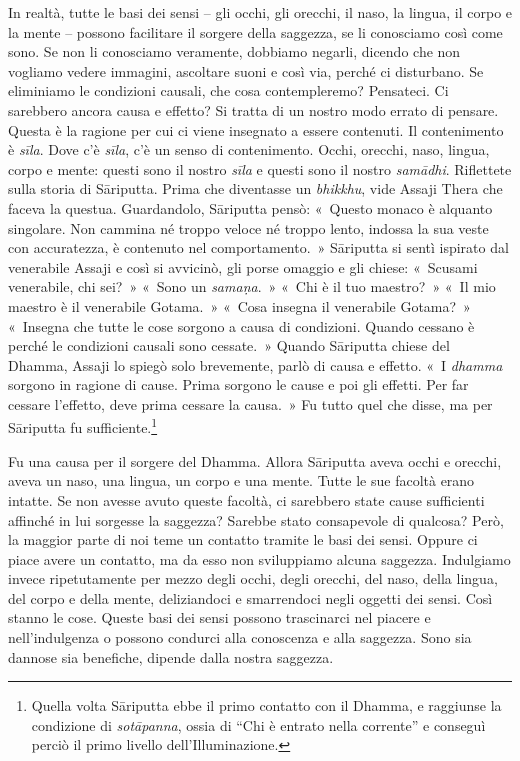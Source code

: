 In realtà, tutte le basi dei sensi -- gli occhi, gli orecchi, il naso,
la lingua, il corpo e la mente -- possono facilitare il sorgere della
saggezza, se li conosciamo così come sono. Se non li conosciamo
veramente, dobbiamo negarli, dicendo che non vogliamo vedere immagini,
ascoltare suoni e così via, perché ci disturbano. Se eliminiamo le
condizioni causali, che cosa contempleremo? Pensateci. Ci sarebbero
ancora causa e effetto? Si tratta di un nostro modo errato di pensare.
Questa è la ragione per cui ci viene insegnato a essere contenuti. Il
contenimento è \emph{sīla}. Dove c'è \emph{sīla}, c'è un senso di
contenimento. Occhi, orecchi, naso, lingua, corpo e mente: questi sono
il nostro \emph{sīla} e questi sono il nostro \emph{samādhi}. Riflettete
sulla storia di Sāriputta. Prima che diventasse un \emph{bhikkhu}, vide
Assaji Thera che faceva la questua. Guardandolo, Sāriputta pensò:
«~Questo monaco è alquanto singolare. Non cammina né troppo veloce né
troppo lento, indossa la sua veste con accuratezza, è contenuto nel
comportamento.~» Sāriputta si sentì ispirato dal venerabile Assaji e
così si avvicinò, gli porse omaggio e gli chiese: «~Scusami venerabile,
chi sei?~» «~Sono un \emph{samaṇa}.~» «~Chi è il tuo maestro?~» «~Il mio
maestro è il venerabile Gotama.~» «~Cosa insegna il venerabile Gotama?~»
«~Insegna che tutte le cose sorgono a causa di condizioni. Quando
cessano è perché le condizioni causali sono cessate.~» Quando Sāriputta
chiese del Dhamma, Assaji lo spiegò solo brevemente, parlò di causa e
effetto. «~I \emph{dhamma} sorgono in ragione di cause. Prima sorgono le
cause e poi gli effetti. Per far cessare l'effetto, deve prima cessare
la causa.~» Fu tutto quel che disse, ma per Sāriputta fu
sufficiente.\footnote{Quella volta Sāriputta ebbe il primo contatto con
  il Dhamma, e raggiunse la condizione di \emph{sotāpanna}, ossia di
  ``Chi è entrato nella corrente'' e conseguì perciò il primo livello
  dell'Illuminazione.}

Fu una causa per il sorgere del Dhamma. Allora Sāriputta aveva occhi e
orecchi, aveva un naso, una lingua, un corpo e una mente. Tutte le sue
facoltà erano intatte. Se non avesse avuto queste facoltà, ci sarebbero
state cause sufficienti affinché in lui sorgesse la saggezza? Sarebbe
stato consapevole di qualcosa? Però, la maggior parte di noi teme un
contatto tramite le basi dei sensi. Oppure ci piace avere un contatto,
ma da esso non sviluppiamo alcuna saggezza. Indulgiamo invece
ripetutamente per mezzo degli occhi, degli orecchi, del naso, della
lingua, del corpo e della mente, deliziandoci e smarrendoci negli
oggetti dei sensi. Così stanno le cose. Queste basi dei sensi possono
trascinarci nel piacere e nell'indulgenza o possono condurci alla
conoscenza e alla saggezza. Sono sia dannose sia benefiche, dipende
dalla nostra saggezza.

